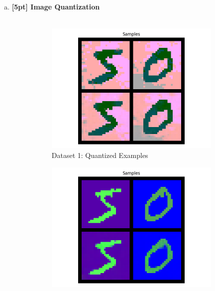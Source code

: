 \documentclass{article}
\begin{document}
\newpage
{}

\begin{enumerate}[(a)]
\item {\bf [5pt] Image Quantization} \\\\
\begin{figure}[H]
    \centering
    \begin{subfigure}{0.45\textwidth}
        \centering
        \includegraphics[width=\textwidth]{figures/q4_a_dset1_samples.png}
        \caption{Dataset 1: Quantized Examples}
    \end{subfigure}
    \hspace{0.2in}
    \begin{subfigure}{0.45\textwidth}
        \centering
        \includegraphics[width=\textwidth]{figures/q4_a_dset2_samples.png}

\end{subfigure}
\end{figure}
\end{enumerate}
\end{document}
